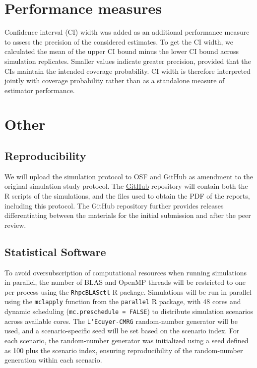 \documentclass[11pt]{article}
\begin{document}
\section{Performance measures}

Confidence interval (CI) width was added as an additional performance measure to assess the precision of the considered estimates. To get the CI width, we calculated the mean of the upper CI bound minus the lower CI bound across simulation replicates. Smaller values indicate greater precision, provided that the CIs maintain the intended coverage probability. CI width is therefore interpreted jointly with coverage probability rather than as a standalone measure of estimator performance.

\section{Other}

\subsection{Reproducibility}
We will upload the simulation protocol to OSF and GitHub as amendment to the original simulation study protocol. The \href{https://github.com/cburgwin/ORB-project-MI-Approach/tree/main}{GitHub} repository will contain both the R scripts of the simulations, and the files used to obtain the PDF of the reports, including this protocol. The GitHub repository further provides releases differentiating between the materials for the initial submission and after the peer review. 

\subsection{Statistical Software}
To avoid oversubscription of computational resources when running simulations in parallel, the number of BLAS and OpenMP threads will be restricted to one per process using the \texttt{RhpcBLASctl} R package. Simulations will be run in parallel using the \texttt{mclapply} function from the \texttt{parallel} R package, with 48 cores and dynamic scheduling (\texttt{mc.preschedule = FALSE}) to distribute simulation scenarios across available cores. The \texttt{L'Ecuyer-CMRG} random-number generator will be used, and a scenario-specific seed will be set based on the scenario index. For each scenario, the random-number generator was initialized using a seed defined as 100 plus the scenario index, ensuring reproducibility of the random-number generation within each scenario.
\end{document}
